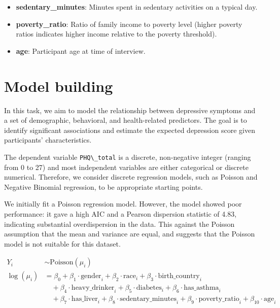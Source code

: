 \documentclass[
  11pt,
]{article}
\newcommand{\passthrough}[1]{#1}
\providecommand{\tightlist}{%
  \setlength{\itemsep}{0pt}\setlength{\parskip}{0pt}}
\begin{document}
\begin{itemize}
\tightlist
\item
  \textbf{sedentary\_minutes}: Minutes spent in sedentary activities on a typical day.
\item
  \textbf{poverty\_ratio}: Ratio of family income to poverty level (higher poverty ratios indicates higher income relative to the poverty threshold).
\item
  \textbf{age}: Participant age at time of interview.
\end{itemize}

\section{Model building}\label{model-building}

In this task, we aim to model the relationship between depressive symptoms and a set of demographic, behavioral, and health-related predictors. The goal is to identify significant associations and estimate the expected depression score given participants' characteristics.

The dependent variable \passthrough{\lstinline!PHQ\_total!} is a discrete, non-negative integer (ranging from 0 to 27) and most independent variables are either categorical or discrete numerical. Therefore, we consider discrete regression models, such as Poisson and Negative Binomial regression, to be appropriate starting points.

We initially fit a Poisson regression model. However, the model showed poor performance: it gave a high AIC and a Pearson dispersion statistic of 4.83, indicating substantial overdispersion in the data. This against the Poisson assumption that the mean and variance are equal, and suggests that the Poisson model is not suitable for this dataset.

\begin{align*}
Y_i &\sim \text{Poisson}(\mu_i) \\
\log(\mu_i) &= \beta_0 + \beta_1 \cdot \text{gender}_i + \beta_2 \cdot \text{race}_i + \beta_3 \cdot \text{birth\_country}_i \\
&\quad + \beta_4 \cdot \text{heavy\_drinker}_i + \beta_5 \cdot \text{diabetes}_i + \beta_6 \cdot \text{has\_asthma}_i \\
&\quad + \beta_7 \cdot \text{has\_liver}_i + \beta_8 \cdot \text{sedentary\_minutes}_i + \beta_9 \cdot \text{poverty\_ratio}_i+ \beta_10 \cdot \text{age}_i
\end{align*}
\end{document}

